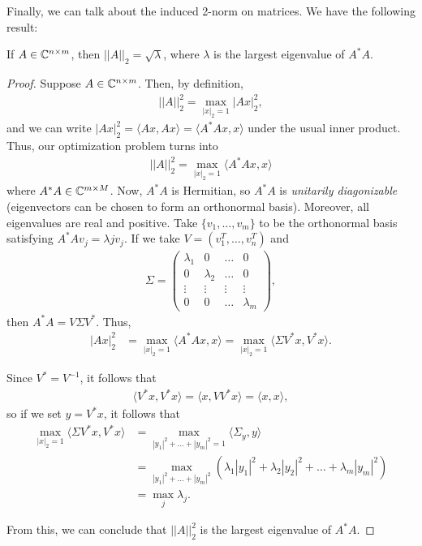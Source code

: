 \documentclass{article}
\begin{document}
Finally, we can talk about the induced 2-norm on matrices. 
We have the following result:
\begin{theorem}
    If $A \in \mathbb{C}^{n \times m}$, then $|| A ||_2 = \sqrt{\lambda}$, where $\lambda$ is the largest eigenvalue of $A^* A$. 
\end{theorem}

\begin{proof}
Suppose $A \in \mathbb{C}^{n \times m}$. Then, by definition,
    \begin{align*}
        ||A||^2_2 = \max_{|x|_2 = 1} |Ax|^2_2,
    \end{align*}
and we can write $|Ax|_2^2 = \langle Ax, Ax\rangle = \langle A^* A x, x \rangle$ under the usual inner product. Thus, our optimization problem turns into 
    \begin{align*}
        ||A||_2^2 = \max_{|x|_2 = 1} \langle A^* A x, x \rangle
    \end{align*}
where $A^* A \in \mathbb{C}^{m \times M}$. Now, $A^* A$ is Hermitian, so $A^*A$ is \textit{unitarily diagonizable} (eigenvectors can be chosen to form an orthonormal basis). Moreover, all eigenvalues are real and positive. Take $\{v_1, \hdots, v_m\}$ to be the orthonormal basis satisfying $A^*A v_j = \lambda j v_j$. If we take $V = (v_1^T, \hdots, v_n^T)$ and 
    \begin{align*}
        \Sigma = \begin{pmatrix}
        \lambda_1 & 0 & \hdots & 0 \\
        0 & \lambda_2 & \hdots & 0 \\
        \vdots & \vdots & \vdots & \vdots \\
        0 & 0 & \hdots & \lambda_m
        \end{pmatrix},
    \end{align*}
then $A^* A = V \Sigma V^*$. Thus, 
\begin{align*}
    |Ax|_2^2 &= \max_{|x|_2 = 1} \langle A^* Ax, x\rangle = \max_{|x|_2 = 1} \langle \Sigma V^* x, V^*x \rangle.
\end{align*} 

Since $V^* = V^{-1}$, it follows that 
    \begin{align*}
        \langle V^* x, V^*x\rangle = \langle x, VV^* x \rangle = \langle x, x\rangle,
    \end{align*}
so if we set $y = V^*x$, it follows that 
\begin{align*}
    \max_{|x|_2 = 1} \langle \Sigma V^*x, V^*x\rangle &= \max_{|y_1|^2 + \hdots + |y_m|^2 = 1} \langle \Sigma_y, y \rangle \\
    &= \max_{|y_1|^2 + \hdots + |y_m|^2} \left(\lambda_1 |y_1|^2 + \lambda_2 |y_2|^2 + \hdots + \lambda_m |y_m|^2 \right) \\
    &= \max_j \lambda_j.
\end{align*}

From this, we can conclude that $||A||_2^2$ is the largest eigenvalue of $A^* A$. 
\end{proof}
\end{document}
